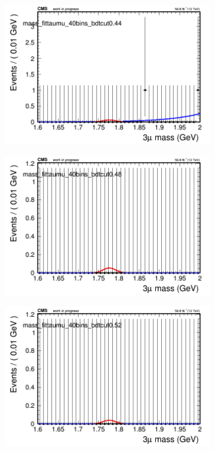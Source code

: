 \begin{figure}[H]
\begin{subfigure}{0.2\textwidth}
        \includegraphics[width=\textwidth]{unfixed_exp/plots/taumu/massfit_taumu_40bins_bdtcut0.44.png}
        \caption{}
    \end{subfigure}
    \begin{subfigure}{0.2\textwidth}
        \includegraphics[width=\textwidth]{unfixed_exp/plots/taumu/massfit_taumu_40bins_bdtcut0.48.png}
        \caption{}
    \end{subfigure}
    \begin{subfigure}{0.2\textwidth}
        \includegraphics[width=\textwidth]{unfixed_exp/plots/taumu/massfit_taumu_40bins_bdtcut0.52.png}

\end{subfigure}
\end{figure}
